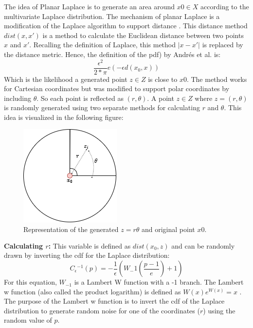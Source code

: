 The idea of Planar Laplace is to generate an area around $x0 \in X$ according to the multivariate Laplace distribution.
The mechanism of planar Laplace is a modification of the Laplace algorithm to support distance \citep{DBLP:journals/corr/abs-1212-1984}.
This distance method $dist(x, x')$ is a method to calculate the Euclidean distance between two points $x$ and $x'$.
Recalling the definition of Laplace, this method $|x-x'|$ is replaced by the distance metric.
Hence, the definition of the \gls{pdf}) by Andrés et al. is:
\begin{equation}
  \frac{\epsilon^2}{2*\pi}e(-\epsilon d(x_0, x))
\end{equation}
Which is the likelihood a generated point $z \in Z$ is close to $x0$.
The method works for Cartesian coordinates but was modified to support polar coordinates by including $\theta$.
So each point is reflected as $(r, \theta)$.
A point $z \in Z$ where $z = (r, \theta)$ is randomly generated using two separate methods for calculating $r$ and $\theta$.
This idea is visualized in the following figure:
\begin{figure}[H]
  \includegraphics[scale=0.6]{TheorethicalFramework/ND-Laplace/Images/polar-laplace.png}
  \centering
  \caption{Representation of the generated $z = {r \theta}$ and original point $x0$.}
  \label{figure:parea}
\end{figure}

\textbf{Calculating $r$:}
This variable is defined as $dist(x_0, z)$ and can be randomly drawn by inverting the \gls{cdf} for the Laplace distribution:
\begin{equation}
  C{_\epsilon}{^{-1}}(p) = - \frac{1}{\epsilon}(W_-1 (\frac{p - 1}{e}) + 1)
\end{equation}
For this equation, $W_{-1}$ is a Lambert W function with a -1 branch.
The Lambert w function (also called the product logarithm) is defined as $W(x)e^{W(x)} = x$ \citep{lehtonen_lambert_2016}.
The purpose of the Lambert w function is to invert the \gls{cdf} of the Laplace distribution to generate random noise for one of the coordinates ($r$) using the random value of $p$.

